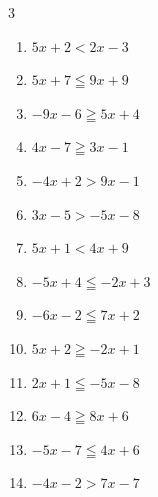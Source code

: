 \begin{multicols}{3}
\begin{enumerate}
  \item $5x+2<2x-3$


  \item $5x+7\leqq 9x+9$


  \item $-9x-6\geqq 5x+4$


  \item $4x-7\geqq 3x-1$

        \phantom{$\displaystyle x\geqq 6$}

  \item $-4x+2>9x-1$


  \item $3x-5>-5x-8$


  \item $5x+1<4x+9$

        \phantom{$\displaystyle x<8$}

  \item $-5x+4\leqq -2x+3$


  \item $-6x-2\leqq 7x+2$


  \item $5x+2\geqq -2x+1$


  \item $2x+1\leqq -5x-8$


  \item $6x-4\geqq 8x+6$

        \phantom{$\displaystyle x\leqq -5$}

  \item $-5x-7\leqq 4x+6$


  \item $-4x-2>7x-7$


\end{enumerate}
\end{multicols}
